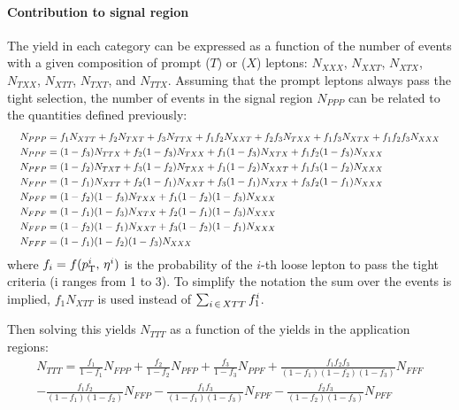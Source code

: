 \paragraph{Contribution to signal region\\}
The yield in each category can be expressed as a function of the number of events
with a given composition of prompt ($T$) or \nonprompt ($X$) leptons:
$N_{XXX}$, $N_{XXT}$, $N_{XTX}$, $N_{TXX}$, $N_{XTT}$, $N_{TXT}$, and $N_{TTX}$.
Assuming that the prompt leptons always pass the tight selection,
the number of \nonprompt events in the signal region $N_{PPP}$ can be related to the quantities defined previously:
\begin{equation}
  \resizebox{\textwidth}{!}{
    $\begin{aligned}
      N_{PPP} &= f_1 N_{XTT} + f_2 N_{TXT}+f_3 N_{TTX}+f_1 f_2 N_{XXT}+f_2 f_3 N_{TXX}+f_1 f_3 N_{XTX}+f_1 f_2 f_3 N_{XXX}\\
      N_{PPF} &= (1-f_3) N_{TTX} + f_2(1-f_3) N_{TXX} + f_1(1-f_3) N_{XTX} + f_1 f_2(1-f_3) N_{XXX}\\
      N_{PFP} &= (1-f_2) N_{TXT} + f_3(1-f_2) N_{TXX} + f_1(1-f_2) N_{XXT} + f_1 f_3(1-f_2) N_{XXX}\\
      N_{FPP} &= (1-f_1) N_{XTT} + f_2(1-f_1) N_{XXT} + f_3(1-f_1) N_{XTX} + f_3 f_2(1-f_1) N_{XXX}\\
      N_{PFF} &= (1-f_2)(1-f_3) N_{TXX} + f_1(1-f_2)(1-f_3) N_{XXX}\\
      N_{FPF} &= (1-f_1)(1-f_3) N_{XTX} + f_2(1-f_1)(1-f_3) N_{XXX}\\
      N_{FFP} &= (1-f_2)(1-f_1) N_{XXT} + f_3(1-f_2)(1-f_1) N_{XXX}\\
      N_{FFF} &= (1-f_1)(1-f_2)(1-f_3) N_{XXX}
    \end{aligned}$
  }
\end{equation}
where $f_i = f(p_{\mathrm{T}}^{i},\, \eta^{i})$ is the probability of the $i$-th loose \nonprompt lepton to pass the tight criteria (i ranges from 1 to 3).
To simplify the notation the sum over the events is implied,
\eg $f_1 N_{XTT}$ is used instead of $\sum_{i\,\in\, XTT}f_1^i$.

Then solving this yields $N_{TTT}$ as a function of the yields in the application regions:
\begin{equation}
\begin{split}
N_{TTT} =
  \frac{f_1}{1-f_1} N_{FPP}
+ \frac{f_2}{1-f_2} N_{PFP}
+ \frac{f_3}{1-f_3} N_{PPF}
+ \frac{f_1 f_2 f_3}{(1-f_1)(1-f_2)(1-f_3)} N_{FFF}\\
- \frac{f_1 f_2}{(1-f_1)(1-f_2)} N_{FFP}
- \frac{f_1 f_3}{(1-f_1)(1-f_3)} N_{FPF}
- \frac{f_2 f_3}{(1-f_2)(1-f_3)} N_{PFF}
\end{split}
\end{equation}
